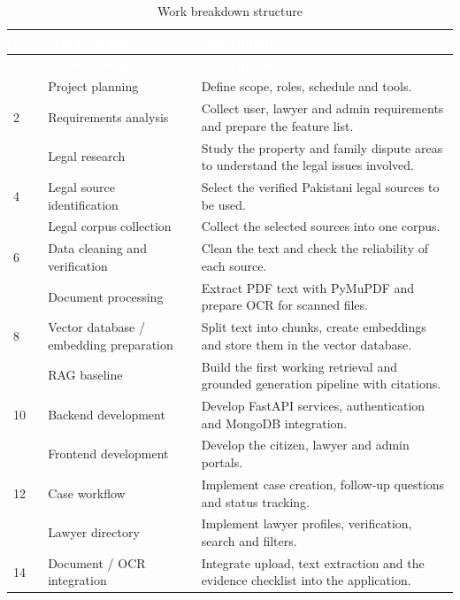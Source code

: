 \documentclass[12pt,a4paper]{report}
\newcommand{\thd}[1]{\textcolor{white}{\textbf{#1}}}
\newcommand{\headrow}{\rowcolor{tablehead}}
\begin{document}
\begin{longtable}{|>{\centering\arraybackslash}p{0.8cm}|L{4.6cm}|L{8.6cm}|}
\caption{Work breakdown structure}\label{tab:wbs}\\
\hline
\headrow \thd{No.} & \thd{Work package} & \thd{Description} \\ \hline
\endfirsthead
\hline
\headrow \thd{No.} & \thd{Work package} & \thd{Description} \\ \hline
{} & Project planning & Define scope, roles, schedule and tools. \\ \hline
{}2 & Requirements analysis & Collect user, lawyer and admin requirements and prepare the feature list. \\  & Legal research & Study the property and family dispute areas to understand the legal issues involved. \\ \hline
{}4 & Legal source identification & Select the verified Pakistani legal sources to be used. \\  & Legal corpus collection & Collect the selected sources into one corpus. \\ \hline
{}6 & Data cleaning and verification & Clean the text and check the reliability of each source. \\  & Document processing & Extract PDF text with PyMuPDF and prepare OCR for scanned files. \\ \hline
{}8 & Vector database / embedding preparation & Split text into chunks, create embeddings and store them in the vector database. \\  & RAG baseline & Build the first working retrieval and grounded generation pipeline with citations. \\ \hline
{}10 & Backend development & Develop FastAPI services, authentication and MongoDB integration. \\  & Frontend development & Develop the citizen, lawyer and admin portals. \\ \hline
{}12 & Case workflow & Implement case creation, follow-up questions and status tracking. \\  & Lawyer directory & Implement lawyer profiles, verification, search and filters. \\ \hline
{}14 & Document / OCR integration & Integrate upload, text extraction and the evidence checklist into the application. \\ \hline

\end{longtable}
\end{document}
